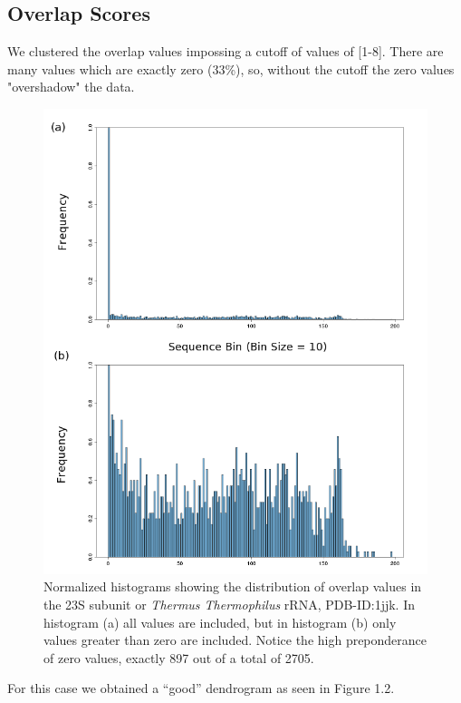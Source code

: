 \subsection{Overlap Scores} 
We clustered the overlap values impossing a cutoff of values
of [1-8]. There are many values which are exactly zero (33\%), so,
without the cutoff the zero values "overshadow" the data.
\begin{figure}[htbp]
\centering 
\includegraphics[angle=0, scale=0.8]{Chapter5/histocompare.png}
\caption{Normalized histograms showing the distribution of overlap values in 
the 23S subunit or \textit{Thermus Thermophilus} rRNA, PDB-ID:1jjk. In histogram 
(a) all values are included, but in histogram (b) only values greater than zero are 
included. Notice the high preponderance of zero values, exactly 897 out of a total
of 2705.}
\end{figure}
For this case we obtained a ``good'' dendrogram as seen in Figure 1.2.
